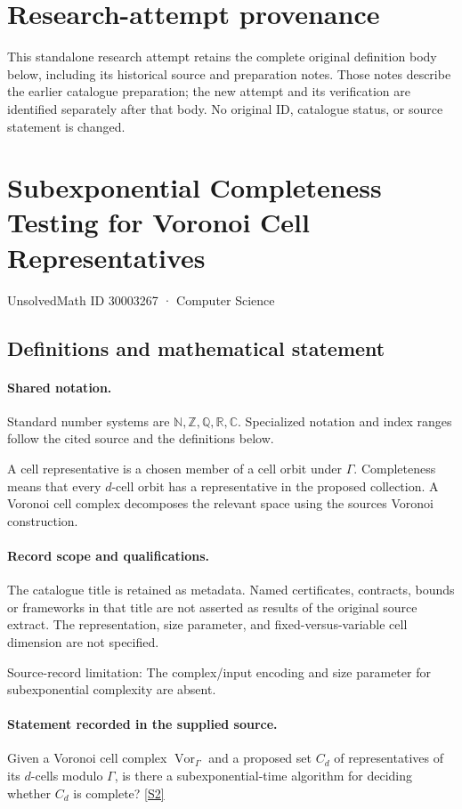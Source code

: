 \documentclass[11pt]{article}
\begin{document}
\section*{Research-attempt provenance}
This standalone research attempt retains the complete original definition body below,
including its historical source and preparation notes. Those notes describe the
earlier catalogue preparation; the new attempt and its verification are identified
separately after that body. No original ID, catalogue status, or source statement is changed.

\section{Subexponential Completeness Testing for Voronoi Cell Representatives}\label{30003267}
{\small UnsolvedMath ID 30003267 · Computer Science}
\subsection{Definitions and mathematical statement}

\paragraph{Shared notation.}Standard number systems are $\mathbb N,\mathbb Z,\mathbb Q,\mathbb R,\mathbb C$. Specialized notation and index ranges follow the cited source and the definitions below.


A cell representative is a chosen member of a cell orbit under $\Gamma$. Completeness means that every $d$-cell orbit has a representative in the proposed collection. A Voronoi cell complex decomposes the relevant space using the source\textquotesingle s Voronoi construction.
\paragraph{Record scope and qualifications.}
The catalogue title is retained as metadata. Named certificates, contracts, bounds or frameworks in that title are not asserted as results of the original source extract.
The representation, size parameter, and fixed-versus-variable cell dimension are not specified.

Source-record limitation: The complex/input encoding and size parameter for subexponential complexity are absent.
\paragraph{Statement recorded in the supplied source.}
Given a Voronoi cell complex $\operatorname{Vor}_\Gamma$ and a proposed set $C_d$ of representatives of its $d$-cells modulo $\Gamma$, is there a subexponential-time algorithm for deciding whether $C_d$ is complete? \href{https://doi.org/10.4171/owr/2016/52}{[S2]}
\end{document}
